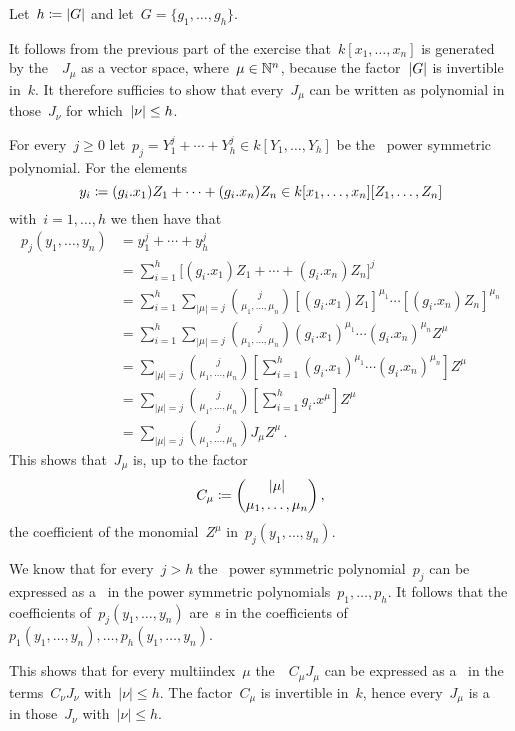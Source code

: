 Let~$h \coloneqq \lvert G\rvert$ and let~$G = \{g_1, \dotsc, g_h\}$.

It follows from the previous part of the exercise that~$k[x_1, \dotsc, x_n]$ is generated by the~~$J_\mu$ as a vector space, where~$\mu \in \mathbb{N}^n$, because the factor~$\lvert G\rvert$ is invertible in~$k$.
It therefore sufficies to show that every~$J_\mu$ can be written as polynomial in those~$J_\nu$ for which~$\lvert\nu\rvert \leq h$.
  
For every~$j \geq 0$ let~$p_j = Y_1^j + \dotsb + Y_h^j \in k[Y_1, \dotsc, Y_h]$ be the~ power symmetric polynomial.
For the elements
\[
            y_i
  \coloneqq  (g_i.x_1) Z_1 + \dotsb + (g_i.x_n) Z_n
  \in       k[x_1, \dotsc, x_n][Z_1, \dotsc, Z_n]
\]
with~$i = 1, \dotsc, h$ we then have that
\begingroup
\allowdisplaybreaks
\begin{align*}
      p_j(y_1, \dotsc, y_n)
  &=  y_1^j + \dotsb + y_h^j  \\
  &=  \sum_{i=1}^h \bigl[ (g_i.x_1) Z_1 + \dotsb + (g_i.x_n) Z_n \bigr]^j  \\
  &=  \sum_{i=1}^h \sum_{|\mu| = j}
      \binom{j}{\mu_1, \dotsc, \mu_n} [(g_i.x_1) Z_1]^{\mu_1} \dotsm [(g_i.x_n) Z_n]^{\mu_n}  \\
  &=  \sum_{i=1}^h \sum_{|\mu| = j}
      \binom{j}{\mu_1, \dotsc, \mu_n} (g_i.x_1)^{\mu_1} \dotsm (g_i.x_n)^{\mu_n} Z^\mu \\
  &=  \sum_{|\mu| = j} \binom{j}{\mu_1, \dotsc, \mu_n}
      \left[
        \sum_{i=1}^h (g_i.x_1)^{\mu_1} \dotsm (g_i.x_n)^{\mu_n}
      \right]
      Z^\mu  \\
  &=  \sum_{|\mu| = j} \binom{j}{\mu_1, \dotsc, \mu_n}
      \left[
        \sum_{i=1}^h g_i.x^\mu
      \right]
      Z^\mu  \\
  &=  \sum_{|\mu| = j} \binom{j}{\mu_1, \dotsc, \mu_n} J_\mu Z^\mu \,.
\end{align*}
\endgroup
This shows that~$J_\mu$ is, up to the factor
\[
            C_\mu
  \coloneqq  \binom{|\mu|}{\mu_1, \dotsc, \mu_n} \,,
\]
the coefficient of the monomial~$Z^\mu$ in~$p_j(y_1, \dotsc, y_n)$.

We know that for every~$j > h$ the~ power symmetric polynomial~$p_j$ can be expressed as a~ in the power symmetric polynomials~$p_1, \dotsc, p_h$.
It follows that the coefficients of~$p_j(y_1, \dotsc, y_n)$ are~s in the coefficients of~$p_1(y_1, \dotsc, y_n), \dotsc, p_h(y_1, \dotsc, y_n)$.

This shows that for every multiindex~$\mu$ the~~$C_\mu J_\mu$ can be expressed as a~ in the terms~$C_\nu J_\nu$ with~$|\nu| \leq h$.
The factor~$C_\mu$ is invertible in~$k$, hence every~$J_\mu$ is a~ in those~$J_\nu$ with~$|\nu| \leq h$.


